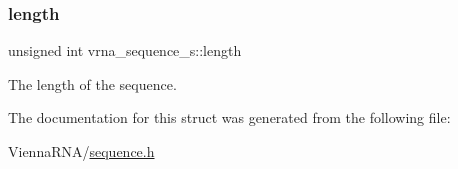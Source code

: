 \subsubsection{\texorpdfstring{length}{length}}
{\footnotesize\ttfamily unsigned int vrna\+\_\+sequence\+\_\+s\+::length}



The length of the sequence. 



The documentation for this struct was generated from the following file\+:\begin{DoxyCompactItemize}
\item 
Vienna\+R\+N\+A/\mbox{\hyperlink{sequence_8h}{sequence.\+h}}\end{DoxyCompactItemize}
